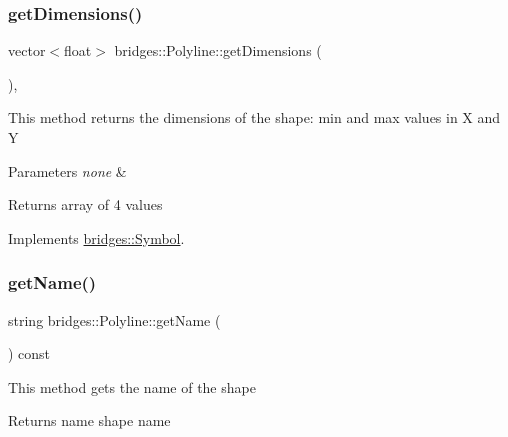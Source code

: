 \subsubsection{\texorpdfstring{get\+Dimensions()}{getDimensions()}}
{\footnotesize\ttfamily vector$<$float$>$ bridges\+::\+Polyline\+::get\+Dimensions (\begin{DoxyParamCaption}{ }\end{DoxyParamCaption})\hspace{0.3cm}{\ttfamily [inline]}, {\ttfamily [virtual]}}

This method returns the dimensions of the shape\+: min and max values in X and Y


\begin{DoxyParams}{Parameters}
{\em none} & \\
\hline
\end{DoxyParams}
\begin{DoxyReturn}{Returns}
array of 4 values 
\end{DoxyReturn}


Implements \mbox{\hyperlink{classbridges_1_1_symbol_a6eb190dc71b31b344b7610a07c6dc1d5}{bridges\+::\+Symbol}}.

\mbox{\label{classbridges_1_1_polyline_a829fe21ce52595ecb7473a4368b136d6}} 
\subsubsection{\texorpdfstring{get\+Name()}{getName()}}
{\footnotesize\ttfamily string bridges\+::\+Polyline\+::get\+Name (\begin{DoxyParamCaption}{ }\end{DoxyParamCaption}) const\hspace{0.3cm}{\ttfamily [inline]}}

This method gets the name of the shape

\begin{DoxyReturn}{Returns}
name shape name 
\end{DoxyReturn}
\mbox{\label{classbridges_1_1_polyline_aab7bddeace9c9e9d5b296666dd9dede5}} 
